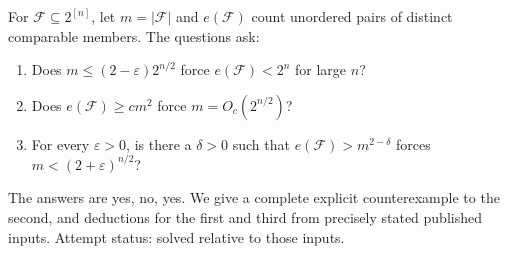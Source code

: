 For \(\mathcal F\subseteq2^{[n]}\), let \(m=|\mathcal F|\) and \(e(\mathcal F)\) count unordered pairs of distinct comparable members. The questions ask:
\begin{enumerate}
\item Does \(m\leq(2-\varepsilon)2^{n/2}\) force \(e(\mathcal F)<2^n\) for large \(n\)?
\item Does \(e(\mathcal F)\geq c m^2\) force \(m=O_c(2^{n/2})\)?
\item For every \(\varepsilon>0\), is there a \(\delta>0\) such that \(e(\mathcal F)>m^{2-\delta}\) forces \(m<(2+\varepsilon)^{n/2}\)?
\end{enumerate}
The answers are yes, no, yes. We give a complete explicit counterexample to the second, and deductions for the first and third from precisely stated published inputs. Attempt status: solved relative to those inputs.
